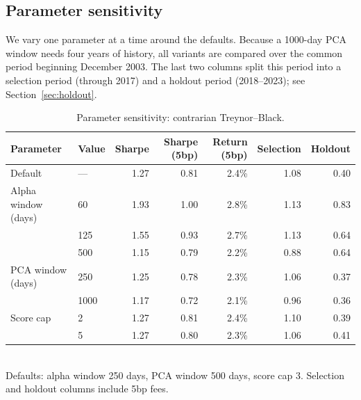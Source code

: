 \documentclass[12pt,letterpaper]{article}
\begin{document}
\subsection{Parameter sensitivity}

We vary one parameter at a time around the defaults. Because a 1000-day PCA window needs four years of history, all variants are compared over the common period beginning December 2003. The last two columns split this period into a selection period (through 2017) and a holdout period (2018--2023); see Section~\ref{sec:holdout}.

\begin{table}[H]
\centering
\caption{Parameter sensitivity: contrarian Treynor--Black.}
\label{tab:sensitivity-tb}
\begin{tabular}{llrrrrr}
\toprule
Parameter & Value & Sharpe & Sharpe (5bp) & Return (5bp) & Selection & Holdout \\
\midrule
Default & --- & 1.27 & 0.81 & 2.4\% & 1.08 & 0.40 \\
Alpha window (days) & 60 & 1.93 & 1.00 & 2.8\% & 1.13 & 0.83 \\
& 125 & 1.55 & 0.93 & 2.7\% & 1.13 & 0.64 \\
& 500 & 1.15 & 0.79 & 2.2\% & 0.88 & 0.64 \\
PCA window (days) & 250 & 1.25 & 0.78 & 2.3\% & 1.06 & 0.37 \\
& 1000 & 1.17 & 0.72 & 2.1\% & 0.96 & 0.36 \\
Score cap & 2 & 1.27 & 0.81 & 2.4\% & 1.10 & 0.39 \\
& 5 & 1.27 & 0.80 & 2.3\% & 1.06 & 0.41 \\
\bottomrule
\end{tabular}
\\[4pt]
\small Defaults: alpha window 250 days, PCA window 500 days, score cap 3. Selection and holdout columns include 5bp fees.
\end{table}
\end{document}
